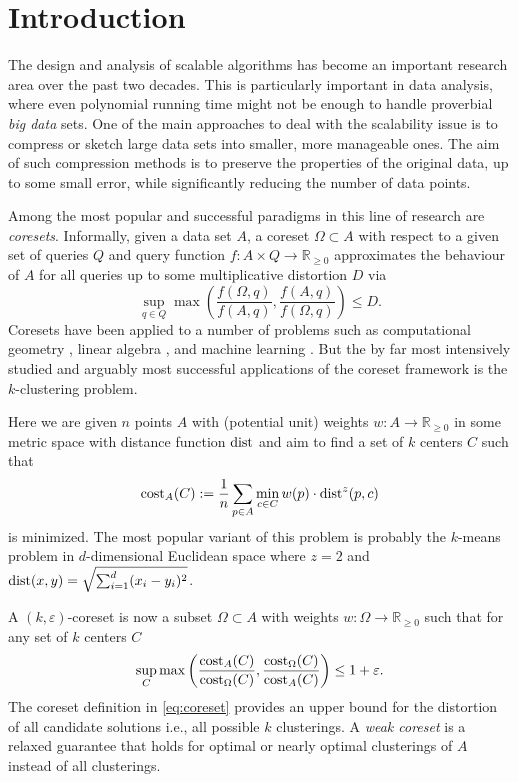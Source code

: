 \section{Introduction}

The design and analysis of scalable algorithms has become an important research area over the past two decades. This is particularly important in data analysis, where even polynomial running time might not be enough to handle proverbial \emph{big data} sets.
One of the main approaches to deal with the scalability issue is to compress or sketch large data sets into smaller, more manageable ones. The aim of such compression methods is to preserve the properties of the original data, up to some small error, while significantly reducing the number of data points.

Among the most popular and successful paradigms in this line of research are \emph{coresets}. Informally, given a data set $A$, a coreset $\Omega \subset A$ with respect to a given set of queries $Q$ and query function $f: A\times Q \rightarrow \mathbb{R}_{\geq 0}$ approximates the behaviour of $A$ for all queries up to some multiplicative distortion $D$ via
\begin{equation*}
    \sup_{q\in Q} \max\left( \frac{f(\Omega,q)}{f(A,q)},\frac{f(A,q)}{f(\Omega,q)}\right) \leq D.
\end{equation*}
Coresets have been applied to a number of problems such as computational geometry \cite{AHV05,Chan09}, linear algebra \cite{IndykMGR20,maalouf2019fast}, and machine learning \cite{MRM21,MunteanuSSW18}. But the by far most intensively studied and arguably most successful applications of the coreset framework is the $k$-clustering problem.

Here we are given $n$ points $A$ with (potential unit) weights $w:A\rightarrow \mathbb{R}_{\geq 0}$ in some metric space with distance function $\text{dist}$ and aim to find a set of $k$ centers $C$ such that 
\begin{equation*}
\text{cost}_A(C):= \frac{1}{n} \sum_{p\in A}  \min_{c\in C} w(p)\cdot \text{dist}^z(p,c)
\end{equation*}
is minimized. The most popular variant of this problem is probably the $k$-means problem in $d$-dimensional Euclidean space where $z=2$ and $\text{dist}(x,y) = \sqrt{\sum_{i=1}^d (x_i-y_i)^2}$.

A $(k,\varepsilon)$-coreset is now a subset $\Omega\subset A$ with weights $w:\Omega\rightarrow \mathbb{R}_{\geq 0}$ such that for any set of $k$ centers $C$
\begin{equation}
\label{eq:coreset}
\sup_{C} \max\left( \frac{\text{cost}_A(C)}{\text{cost}_{\Omega}(C)},\frac{\text{cost}_{\Omega}(C)}{\text{cost}_{A}(C)}\right) \leq 1+\varepsilon.
\end{equation}
The coreset definition in \cref{eq:coreset} provides an upper bound for the distortion of all candidate solutions i.e., all possible $k$ clusterings. 
A \emph{weak coreset} is a relaxed guarantee that holds for optimal or nearly optimal clusterings of $A$ instead of all clusterings.


